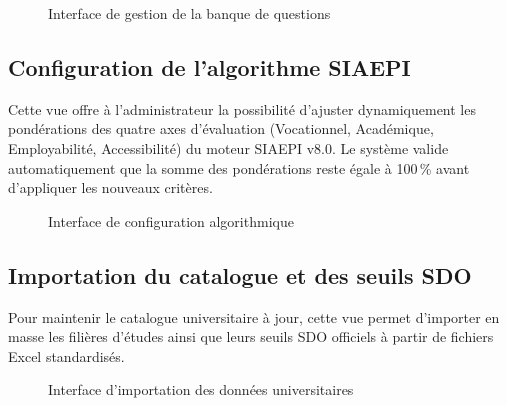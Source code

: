 \begin{figure}[H]
    \centering
    \caption{Interface de gestion de la banque de questions}
    \label{fig:interface_questions_calibration}
\end{figure}

\subsection{Configuration de l'algorithme SIAEPI}

Cette vue offre à l'administrateur la possibilité d'ajuster dynamiquement les pondérations des quatre axes d'évaluation (Vocationnel, Académique, Employabilité, Accessibilité) du moteur SIAEPI v8.0. Le système valide automatiquement que la somme des pondérations reste égale à 100\,\% avant d'appliquer les nouveaux critères.

\begin{figure}[H]
    \centering
    \caption{Interface de configuration algorithmique}
    \label{fig:interface_references_weighting}
\end{figure}

\subsection{Importation du catalogue et des seuils SDO}

Pour maintenir le catalogue universitaire à jour, cette vue permet d'importer en masse les filières d'études ainsi que leurs seuils SDO officiels à partir de fichiers Excel standardisés.

\begin{figure}[H]
    \centering
    \caption{Interface d'importation des données universitaires}
    \label{fig:interface_import_filieres}
\end{figure}

